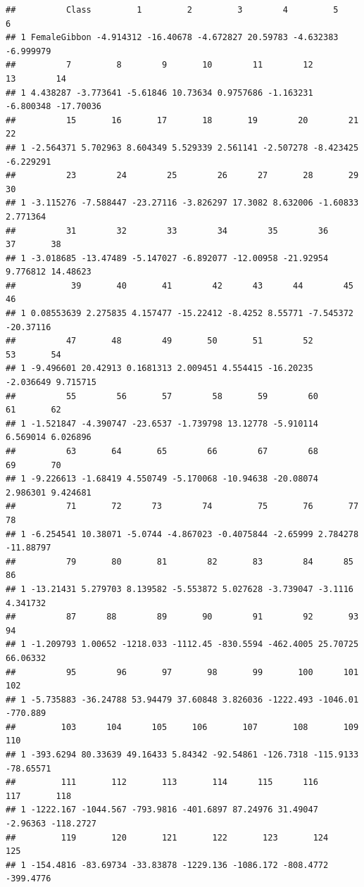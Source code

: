 \documentclass[]{book}
\begin{document}
\begin{verbatim}
##          Class         1         2         3        4         5         6
## 1 FemaleGibbon -4.914312 -16.40678 -4.672827 20.59783 -4.632383 -6.999979
##          7         8        9       10        11        12        13        14
## 1 4.438287 -3.773641 -5.61846 10.73634 0.9757686 -1.163231 -6.800348 -17.70036
##          15       16       17       18       19        20        21        22
## 1 -2.564371 5.702963 8.604349 5.529339 2.561141 -2.507278 -8.423425 -6.229291
##          23        24        25        26      27       28       29       30
## 1 -3.115276 -7.588447 -23.27116 -3.826297 17.3082 8.632006 -1.60833 2.771364
##          31        32        33        34        35        36       37       38
## 1 -3.018685 -13.47489 -5.147027 -6.892077 -12.00958 -21.92954 9.776812 14.48623
##           39       40       41        42      43      44        45        46
## 1 0.08553639 2.275835 4.157477 -15.22412 -8.4252 8.55771 -7.545372 -20.37116
##          47       48        49       50       51        52        53       54
## 1 -9.496601 20.42913 0.1681313 2.009451 4.554415 -16.20235 -2.036649 9.715715
##          55        56       57        58       59        60       61       62
## 1 -1.521847 -4.390747 -23.6537 -1.739798 13.12778 -5.910114 6.569014 6.026896
##          63       64       65        66        67        68       69       70
## 1 -9.226613 -1.68419 4.550749 -5.170068 -10.94638 -20.08074 2.986301 9.424681
##          71       72      73        74         75       76       77        78
## 1 -6.254541 10.38071 -5.0744 -4.867023 -0.4075844 -2.65999 2.784278 -11.88797
##          79       80       81        82       83        84      85       86
## 1 -13.21431 5.279703 8.139582 -5.553872 5.027628 -3.739047 -3.1116 4.341732
##          87      88        89       90        91        92       93       94
## 1 -1.209793 1.00652 -1218.033 -1112.45 -830.5594 -462.4005 25.70725 66.06332
##          95        96       97       98       99       100      101      102
## 1 -5.735883 -36.24788 53.94479 37.60848 3.826036 -1222.493 -1046.01 -770.889
##         103      104      105     106       107       108       109       110
## 1 -393.6294 80.33639 49.16433 5.84342 -92.54861 -126.7318 -115.9133 -78.65571
##         111       112       113       114      115      116      117       118
## 1 -1222.167 -1044.567 -793.9816 -401.6897 87.24976 31.49047 -2.96363 -118.2727
##         119       120       121       122       123       124       125
## 1 -154.4816 -83.69734 -33.83878 -1229.136 -1086.172 -808.4772 -399.4776

\end{verbatim}
\end{document}
